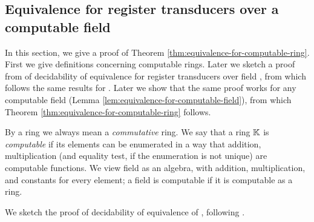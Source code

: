 \subsection{Equivalence for register transducers over a computable field}\label{sec:pol-transducers-any-ring}


In this section, we give a proof of Theorem \ref{thm:equivalence-for-computable-ring}.
\thmequivalenceComputableRing*
First we give definitions concerning computable rings. Later we sketch a proof from \cite[Theorem 6.6]{seidlManethKemper2018} of decidability of equivalence for register transducers over field \Q, from which follows the same results for \Z. Later we show that the same proof works for any computable field (Lemma \ref{lem:equivalence-for-computable-field}), from which Theorem \ref{thm:equivalence-for-computable-ring} follows.

By a ring we always mean a \emph{commutative} ring.
We say that a ring ${\mathbb K}$ is \emph{computable} if its elements can be enumerated in a way that addition, multiplication (and equality test, if the enumeration is not unique) are computable functions. %
We view field as an algebra, with addition, multiplication, and constants for every element; a field is computable if it is computable as a ring.


We sketch the proof of decidability of equivalence of \polTsover{\Q}, following \cite{seidlManethKemper2018}.

